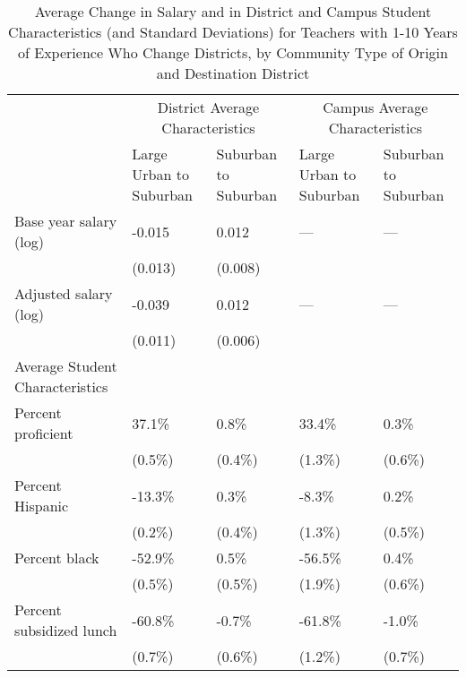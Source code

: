 \documentclass[]{article}
\begin{document}
\begin{table}[ht]
\centering
\begin{tabular}{lp{}p{}p{}p{}}
  \hline
 & \multicolumn{2}{c}{District Average Characteristics} & \multicolumn{2}{c}{Campus Average Characteristics}\\ \cline{2-5}
 & Large Urban to Suburban & Suburban to Suburban & Large Urban to Suburban & Suburban to Suburban \\
  \hline
Base year salary (log) & -0.015 & 0.012 & --- & --- \\ 
   & (0.013) & (0.008) &  &  \\ 
  Adjusted salary (log) & -0.039 & 0.012 & --- & --- \\ 
   & (0.011) & (0.006) &  &  \\ 
Average Student Characteristics & & & & \\
  \quad Percent proficient & 37.1\% & 0.8\% & 33.4\% & 0.3\% \\ 
   & (0.5\%) & (0.4\%) & (1.3\%) & (0.6\%) \\ 
  \quad Percent Hispanic & -13.3\% & 0.3\% & -8.3\% & 0.2\% \\ 
   & (0.2\%) & (0.4\%) & (1.3\%) & (0.5\%) \\ 
  \quad Percent black & -52.9\% & 0.5\% & -56.5\% & 0.4\% \\ 
   & (0.5\%) & (0.5\%) & (1.9\%) & (0.6\%) \\ 
  \quad Percent subsidized lunch & -60.8\% & -0.7\% & -61.8\% & -1.0\% \\ 
   & (0.7\%) & (0.6\%) & (1.2\%) & (0.7\%) \\ 
   \hline
\end{tabular}
\caption{Average Change in Salary and in District and Campus Student Characteristics (and Standard Deviations) for Teachers with 1-10 Years of Experience Who Change Districts, by Community Type of Origin and Destination District} 
\label{tbl:change_by_urb}
\end{table}
\end{document}
